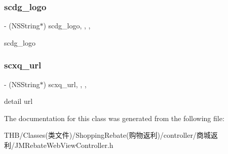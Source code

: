 \subsubsection{\texorpdfstring{scdg\+\_\+logo}{scdg\_logo}}
{\footnotesize\ttfamily -\/ (N\+S\+String$\ast$) scdg\+\_\+logo\hspace{0.3cm}{\ttfamily [read]}, {\ttfamily [write]}, {\ttfamily [nonatomic]}, {\ttfamily [copy]}}

scdg\+\_\+logo \mbox{\label{interface_j_m_rebate_web_view_controller_ac804af310bf3c5b724d1f0efacb17417}} 
\subsubsection{\texorpdfstring{scxq\+\_\+url}{scxq\_url}}
{\footnotesize\ttfamily -\/ (N\+S\+String$\ast$) scxq\+\_\+url\hspace{0.3cm}{\ttfamily [read]}, {\ttfamily [write]}, {\ttfamily [nonatomic]}, {\ttfamily [copy]}}

detail url 

The documentation for this class was generated from the following file\+:\begin{DoxyCompactItemize}
\item 
T\+H\+B/\+Classes(类文件)/\+Shopping\+Rebate(购物返利)/controller/商城返利/J\+M\+Rebate\+Web\+View\+Controller.\+h\end{DoxyCompactItemize}
